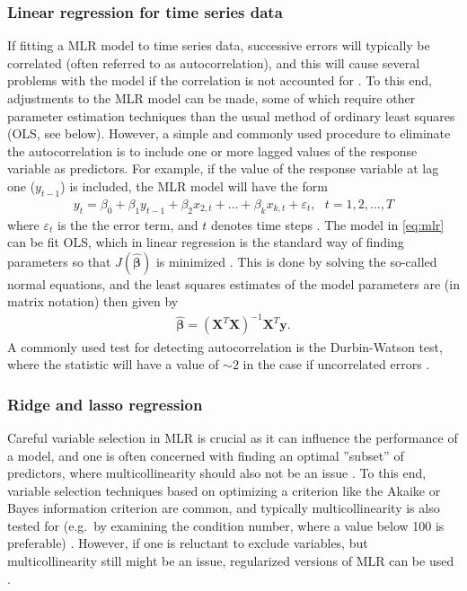 \subsubsection{Linear regression for time series data}
If fitting a MLR model to time series data, successive errors will typically be correlated (often referred to as autocorrelation), and this will cause several problems with the model if the correlation is not accounted for \cite{Montgomery2015}. To this end, adjustments to the MLR model can be made, some of which require other parameter estimation techniques than the usual method of ordinary least squares (OLS, see below). However, a simple and commonly used procedure to eliminate the autocorrelation is to include one or more lagged values of the response variable as predictors. For example, if the value of the response variable at lag one ($y_{t-1}$) is included, the MLR model will have the form 
\begin{align}
y_t = \beta_0 + \beta_{1} y_{t-1} + \beta_2 x_{2,t} + ... + \beta_{k} x_{k,t} + \varepsilon_t, \: \: \: t = 1, 2, ..., T
\label{eq:mlr}
\end{align}
where $\varepsilon_t$ is the the error term, and $t$ denotes time steps \cite{Montgomery2015}. The model in \cref{eq:mlr} can be fit OLS, which in linear regression is the standard way of finding parameters so that $J(\bm{\hat{\beta}})$ is minimized \cite{Montgomery2012}. This is done by solving the so-called normal equations,
and the least squares estimates of the model parameters are (in matrix notation) then given by
\begin{align}
\bm{\hat{\beta}} = (\bm{X}^T\bm{X})^{-1}\bm{X}^T\bm{y}.
\label{eq:normal_sol} 
\end{align}
A commonly used test for detecting autocorrelation is the Durbin-Watson test, where the statistic will have a value of $\sim 2$ in the case if uncorrelated errors \cite{Montgomery2015}.

\subsubsection{Ridge and lasso regression}
Careful variable selection in MLR is crucial as it can influence the performance of a model, and one is often concerned with finding an optimal ”subset” of predictors, where multicollinearity should also not be an issue \cite{Montgomery2012}. To this end, variable selection techniques based on optimizing a criterion like the Akaike or Bayes information criterion are common, and typically multicollinearity is also tested for (e.g.\ by examining the condition number, where a value below 100 is preferable) \cite{Montgomery2012}. However, if one is reluctant to exclude variables, but multicollinearity still might be an issue, regularized versions of MLR can be used \cite{Montgomery2012}. 

